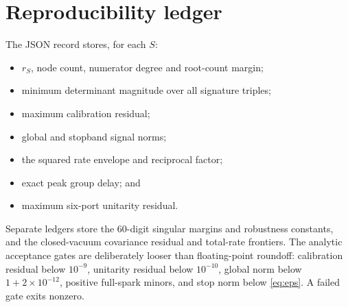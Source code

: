 \documentclass[11pt]{article}
\theoremstyle{definition}
\theoremstyle{remark}
\begin{document}
\section{Reproducibility ledger}

The JSON record stores, for each $S$:
\begin{itemize}
 \item $r_S$, node count, numerator degree and root-count margin;
 \item minimum determinant magnitude over all signature triples;
 \item maximum calibration residual;
 \item global and stopband signal norms;
 \item the squared rate envelope and reciprocal factor;
 \item exact peak group delay; and
 \item maximum six-port unitarity residual.
\end{itemize}
Separate ledgers store the 60-digit singular margins and robustness constants,
and the closed-vacuum covariance residual and total-rate frontiers.
The analytic acceptance gates are deliberately looser than floating-point
roundoff: calibration residual below $10^{-9}$, unitarity residual below
$10^{-10}$, global norm below $1+2\times10^{-12}$, positive full-spark minors,
and stop norm below \eqref{eq:eps}.  A failed gate exits nonzero.



\end{document}
